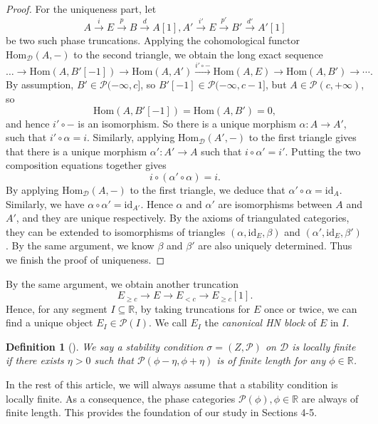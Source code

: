 \documentclass[a4paper,12pt]{amsart}
\numberwithin{equation}{section}
\newtheorem{definition}[theorem]{Definition}
\newcommand{\Hom}{\mathrm{Hom}}
\newcommand{\id}{\mathrm{id}}
\newcommand{\1}{\mathbf{1}}
\begin{document}
\begin{proof}
        For the uniqueness part, let
        \[A\xrightarrow{i} E\xrightarrow{p} B\xrightarrow{d} A[1],A'\xrightarrow{i'} E\xrightarrow{p'} B'\xrightarrow{d'} A'[1]\]
        be two such phase truncations. Applying the cohomological functor $\Hom_{\mathcal{D}}(A,-)$ to the second triangle, we obtain the long exact sequence
        \[\dots\rightarrow\Hom(A,B'[-1])\rightarrow\Hom(A,A')\xrightarrow{i'\circ-}\Hom(A,E)\rightarrow\Hom(A,B')\rightarrow\cdots.\]
        By assumption, $B'\in\mathcal{P}(-\infty,c]$, so $B'[-1]\in\mathcal{P}(-\infty,c-1]$, but $A\in\mathcal{P}(c,+\infty)$, so
        \[\Hom(A,B'[-1])=\Hom(A,B')=0,\]
        and hence $i'\circ-$ is an isomorphism. So there is a unique morphism $\alpha:A\rightarrow A'$, such that $i'\circ\alpha=i$. Similarly, applying $\Hom_{\mathcal{D}}(A',-)$ to the first triangle gives that there is a unique morphism $\alpha':A'\rightarrow A$ such that $i\circ\alpha'=i'$. Putting the two composition equations together gives
        \[i\circ(\alpha'\circ\alpha)=i.\]
        By applying $\Hom_{\mathcal{D}}(A,-)$ to the first triangle, we deduce that $\alpha'\circ\alpha=\id_A$. Similarly, we have $\alpha\circ\alpha'=\id_{A'}$. Hence $\alpha$ and $\alpha'$ are isomorphisms between $A$ and $A'$, and they are unique respectively. By the axioms of triangulated categories, they can be extended to isomorphisms of triangles $(\alpha,\id_E,\beta)$ and $(\alpha',\id_E,\beta')$. By the same argument, we know $\beta$ and $\beta'$ are also uniquely determined. Thus we finish the proof of uniqueness.
\end{proof}
By the same argument, we obtain another truncation
\[E_{\geqslant c}\rightarrow E\rightarrow E_{<c}\rightarrow E_{\geqslant c}[1].\]
Hence, for any segment $I\subseteq\mathbb{R}$, by taking truncations for $E$ once or twice, we can find a unique object $E_I\in\mathcal{P}(I)$. We call $E_I$ the \emph{canonical HN block} of $E$ in $I$.

\begin{definition}[{\cite[Definition 5.7]{Bri2007}}]
    We say a stability condition $\sigma=(Z,\mathcal{P})$ on $\mathcal{D}$ is \emph{locally finite} if there exists $\eta>0$ such that $\mathcal{P}(\phi-\eta,\phi+\eta)$ is of finite length for any $\phi\in\mathbb{R}$.
\end{definition}
In the rest of this article, we will always assume that a stability condition is locally finite. As a consequence, the phase categories $\mathcal{P}(\phi),\phi\in\mathbb{R}$ are always of finite length.
This provides the foundation of our study in Sections 4-5.
\end{document}
